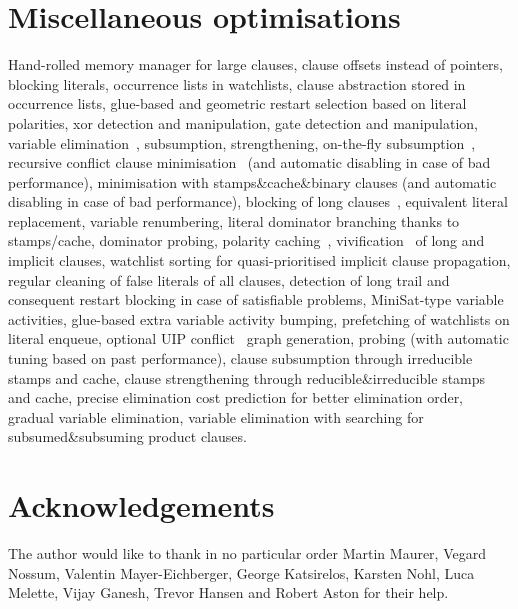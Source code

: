 \documentclass[final]{ieee}
\begin{document}
\section{Miscellaneous optimisations}
Hand-rolled memory manager for large clauses, clause offsets instead of pointers, blocking literals, occurrence lists in watchlists, clause abstraction stored in occurrence lists, glue-based and geometric restart selection based on literal polarities, xor detection and manipulation, gate detection and manipulation, variable elimination~\cite{DBLP:conf/sat/EenB05}, subsumption, strengthening, on-the-fly subsumption~\cite{DBLP:conf/sat/HanS09}, recursive conflict clause minimisation~\cite{DBLP:conf/sat/SorenssonB09} (and automatic disabling in case of bad performance), minimisation with stamps\&cache\&binary clauses (and automatic disabling in case of bad performance), blocking of long clauses~\cite{DBLP:conf/tacas/JarvisaloBH10}, equivalent literal replacement, variable renumbering, literal dominator branching thanks to stamps/cache, dominator probing, polarity caching~\cite{DBLP:conf/sat/PipatsrisawatD07}, vivification~\cite{DBLP:conf/ecai/PietteHS08} of long and implicit clauses, watchlist sorting for quasi-prioritised implicit clause propagation, regular cleaning of false literals of all clauses, detection of long trail and consequent restart blocking in case of satisfiable problems, MiniSat-type variable activities, glue-based extra variable activity bumping, prefetching of watchlists on literal enqueue, optional UIP conflict~\cite{244560} graph generation, probing (with automatic tuning based on past performance), clause subsumption through irreducible stamps and cache, clause strengthening through reducible\&irreducible stamps and cache, precise elimination cost prediction for better elimination order, gradual variable elimination, variable elimination with searching for subsumed\&subsuming product clauses.

\section*{Acknowledgements}
The author would like to thank in no particular order Martin Maurer, Vegard Nossum, Valentin Mayer-Eichberger, George Katsirelos, Karsten Nohl, Luca Melette, Vijay Ganesh, Trevor Hansen and Robert Aston for their help.




\vfill
\pagebreak
\end{document}
